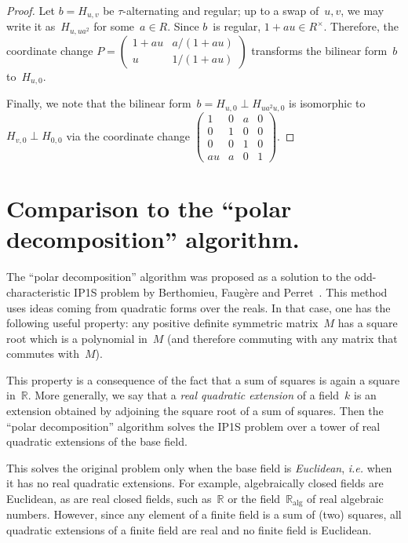 \documentclass{lms}
\def\mat#1{\begin{pmatrix}#1\end{pmatrix}}
\begin{document}
\begin{proof}
Let $b = H_{u,v}$ be $τ$-alternating and regular; up to a swap of~$u, v$, we
may write it as~$H_{u, u a^2}$ for some~$a ∈ R$. Since $b$~is
regular, $1 + a u ∈ R^{×}$. Therefore, the coordinate
change $P = \mat{1+a u & a/(1+a u) \\ u & 1/(1+a u)}$ transforms the
bilinear form~$b$ to~$H_{u, 0}$.

Finally, we note that the bilinear form~$b = H_{u, 0} ⟂ H_{u a^2 u, 0}$ is
isomorphic to~$H_{v, 0} ⟂ H_{0,0}$ via the coordinate change
$\mat{1 & 0 & a & 0\\0&1&0&0\\0&0&1&0\\au & a & 0 & 1}$.
\end{proof}


\section{Comparison to the ``polar decomposition'' algorithm.}
\label{ap:polar}

The “polar decomposition” algorithm was proposed as a solution to
the odd-characteristic IP1S problem by
Berthomieu, Faugère and Perret~\cite{2013bfp}.
This method uses ideas coming from quadratic forms over the reals.
In that case, one has the following useful property:
any positive definite symmetric matrix~$M$ has a square root
which is a polynomial in~$M$
(and therefore commuting with any matrix that commutes with~$M$).

This property is a consequence of the fact
that a sum of squares is again a square in~$ℝ$.
More generally, we say that a \emph{real quadratic extension} of a field~$k$
is an extension obtained by adjoining the square root of a sum of squares.
Then the “polar decomposition” algorithm solves the IP1S problem
over a tower of real quadratic extensions of the base field.

This solves the original problem only when the base field is \emph{Euclidean},
\emph{i.e.} when it has no real quadratic extensions.
For example, algebraically closed fields are Euclidean,
as are real closed fields, such as~$ℝ$
or the field~$ℝ_{\mathrm{alg}}$ of real algebraic numbers.
However, since any element of a finite field is a sum of (two) squares,
all quadratic extensions of a finite field are real
and no finite field is Euclidean.
\end{document}

